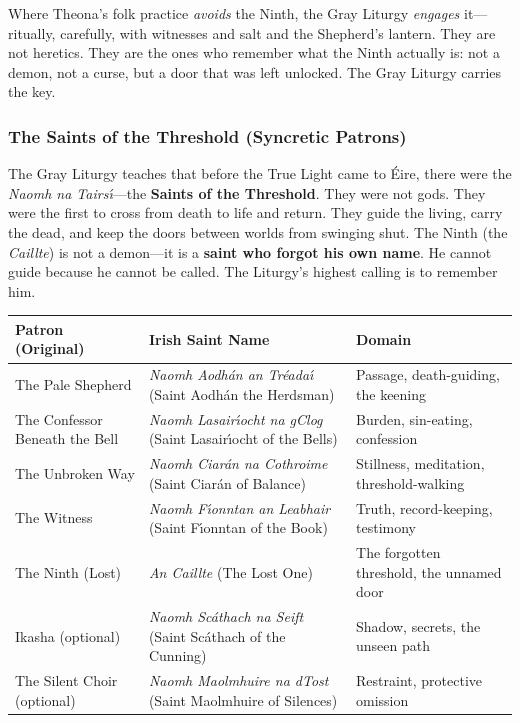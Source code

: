 Where Theona's folk practice \textit{avoids} the Ninth, the Gray Liturgy \textit{engages} it---ritually, carefully, with witnesses and salt and the Shepherd's lantern. They are not heretics. They are the ones who remember what the Ninth actually is: not a demon, not a curse, but a door that was left unlocked. The Gray Liturgy carries the key.

\subsubsection*{The Saints of the Threshold (Syncretic Patrons)}

The Gray Liturgy teaches that before the True Light came to \'Eire, there were the \textit{Naomh na Tairs\'{\i}}---the \textbf{Saints of the Threshold}. They were not gods. They were the first to cross from death to life and return. They guide the living, carry the dead, and keep the doors between worlds from swinging shut. The Ninth (the \textit{Caillte}) is not a demon---it is a \textbf{saint who forgot his own name}. He cannot guide because he cannot be called. The Liturgy's highest calling is to remember him.

\begin{longtable}{|p{}|p{}|p{}|}
\hline
\textbf{Patron (Original)} & \textbf{Irish Saint Name} & \textbf{Domain} \\
\hline
The Pale Shepherd & \textit{Naomh Aodh\'an an Tr\'eada\'{\i}} (Saint Aodh\'an the Herdsman) & Passage, death-guiding, the keening \\
\hline
The Confessor Beneath the Bell & \textit{Naomh Lasair\'{\i}ocht na gClog} (Saint Lasair\'{\i}ocht of the Bells) & Burden, sin-eating, confession \\
\hline
The Unbroken Way & \textit{Naomh Ciar\'an na Cothroime} (Saint Ciar\'an of Balance) & Stillness, meditation, threshold-walking \\
\hline
The Witness & \textit{Naomh F\'{\i}onntan an Leabhair} (Saint F\'{\i}onntan of the Book) & Truth, record-keeping, testimony \\
\hline
The Ninth (Lost) & \textit{An Caillte} (The Lost One) & The forgotten threshold, the unnamed door \\
\hline
Ikasha (optional) & \textit{Naomh Sc\'athach na Seift} (Saint Sc\'athach of the Cunning) & Shadow, secrets, the unseen path \\
\hline
The Silent Choir (optional) & \textit{Naomh Maolmhuire na dTost} (Saint Maolmhuire of Silences) & Restraint, protective omission \\
\hline
\end{longtable}

